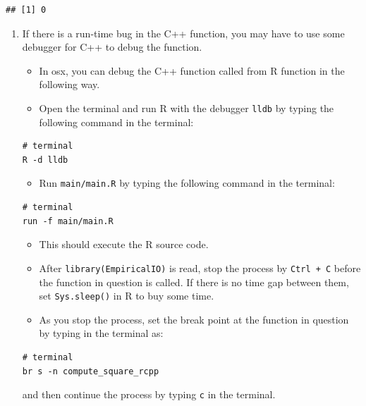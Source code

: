 \documentclass[
]{book}
\providecommand{\tightlist}{%
  \setlength{\itemsep}{0pt}\setlength{\parskip}{0pt}}
\begin{document}
\begin{verbatim}
## [1] 0
\end{verbatim}

\begin{enumerate}
\def\labelenumi{\arabic{enumi}.}
\setcounter{enumi}{11}
\tightlist
\item
  If there is a run-time bug in the C++ function, you may have to use some debugger for C++ to debug the function.

  \begin{itemize}
  \tightlist
  \item
    In osx, you can debug the C++ function called from R function in the following way.
  \item
    Open the terminal and run R with the debugger \texttt{lldb} by typing the following command in the terminal:
  \end{itemize}

\begin{verbatim}
# terminal
R -d lldb
\end{verbatim}

  \begin{itemize}
  \tightlist
  \item
    Run \texttt{main/main.R} by typing the following command in the terminal:
  \end{itemize}

\begin{verbatim}
# terminal
run -f main/main.R
\end{verbatim}

  \begin{itemize}
  \tightlist
  \item
    This should execute the R source code.
  \item
    After \texttt{library(EmpiricalIO)} is read, stop the process by \texttt{Ctrl\ +\ C} before the function in question is called. If there is no time gap between them, set \texttt{Sys.sleep()} in R to buy some time.
  \item
    As you stop the process, set the break point at the function in question by typing in the terminal as:
  \end{itemize}

\begin{verbatim}
# terminal
br s -n compute_square_rcpp
\end{verbatim}

  and then continue the process by typing \texttt{c} in the terminal.


\end{enumerate}
\end{document}
